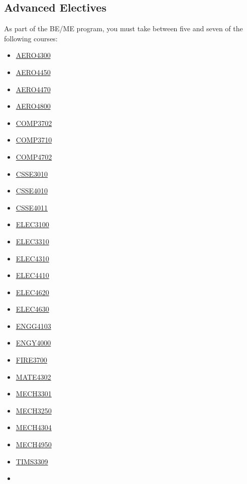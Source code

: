 \hypertarget{ADVANCED}{\subsection{Advanced Electives}}
As part of the BE/ME program, you must take between five and seven of the following courses:
\begin{multicols}{3}
    \begin{itemize}
        \item \hyperlink{AERO4300}{AERO4300}
        \item \hyperlink{AERO4450}{AERO4450}
        \item \hyperlink{AERO4470}{AERO4470}
        \item \hyperlink{AERO4800}{AERO4800}
        \item \hyperlink{COMP3702}{COMP3702}
        \item \hyperlink{COMP3710}{COMP3710}
        \item \hyperlink{COMP4702}{COMP4702}
        \item \hyperlink{CSSE3010}{CSSE3010}
        \item \hyperlink{CSSE4010}{CSSE4010}
        \item \hyperlink{CSSE4011}{CSSE4011}
        \item \hyperlink{ELEC3100}{ELEC3100}
        \item \hyperlink{ELEC3310}{ELEC3310}
        \item \hyperlink{ELEC4310}{ELEC4310}
        \item \hyperlink{ELEC4410}{ELEC4410}
        \item \hyperlink{ELEC4620}{ELEC4620}
        \item \hyperlink{ELEC4630}{ELEC4630}
        \item \hyperlink{ENGG4103}{ENGG4103}
        \item \hyperlink{ENGY4000}{ENGY4000}
        \item \hyperlink{FIRE3700}{FIRE3700}
        \item \hyperlink{MATE4302}{MATE4302}
        \item \hyperlink{MECH3301}{MECH3301}
        \item \hyperlink{MECH3250}{MECH3250}
        \item \hyperlink{MECH4304}{MECH4304}
        \item \hyperlink{MECH4950}{MECH4950}
        \item \hyperlink{TIMS3309}{TIMS3309}
        \item[]
    \end{itemize}
\end{multicols}

